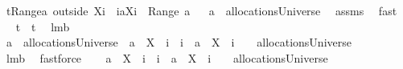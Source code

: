 \begin{isabellebody}
\isamarkupfalse%
\ {\isacharquery}t{}{\isacharequal}{\isachardoublequoteopen}{\isasymUnion}{\isacharparenleft}Range{\isacharparenleft}{\isacharparenleft}a\ outside\ {\isacharparenleft}X{\isasymunion}{\isacharbraceleft}i{\isacharbraceright}{\isacharparenright}{\isacharparenright}\ {\isasymunion}\ {\isacharparenleft}{\isacharbraceleft}i{\isacharbraceright}{\isasymtimes}{\isacharparenleft}{\isacharbraceleft}{\isasymUnion}{\isacharparenleft}a{\isacharbackquote}{\isacharbackquote}{\isacharparenleft}X{\isasymunion}{\isacharbraceleft}i{\isacharbraceright}{\isacharparenright}{\isacharparenright}{\isacharbraceright}{\isacharminus}{\isacharbraceleft}{\isacharbraceleft}{\isacharbraceright}{\isacharbraceright}{\isacharparenright}{\isacharparenright}{\isacharparenright}{\isacharparenright}\ {\isacharequal}\ {\isasymUnion}{\isacharparenleft}Range\ a{\isacharparenright}{\isachardoublequoteclose}\isanewline
{}\isamarkupfalse%
\ \isanewline
{}{\isacharcolon}\ {\isachardoublequoteopen}a\ {\isasymin}\ allocationsUniverse{\isachardoublequoteclose}\ \isamarkupfalse%
\ assms{\isacharparenleft}{}{\isacharparenright}\ \isamarkupfalse%
\ fast\ \isanewline
{}\isamarkupfalse%
\ \isamarkupfalse%
\ {\isachardoublequoteopen}{\isacharquery}t{}\ {\isacharampersand}\ {\isacharquery}t{}{\isachardoublequoteclose}\ \isamarkupfalse%
\ lm{}{}b\ \isanewline
{}\isamarkupfalse%
\ {\isacharminus}\ \isanewline
\isanewline
\ \ \isamarkupfalse%
\ {\isachardoublequoteopen}a\ {\isasymin}\ allocationsUniverse\ {\isasymlongrightarrow}\ a\ {\isacharminus}{\isacharbar}\ {\isacharparenleft}X\ {\isasymunion}\ {\isacharbraceleft}i{\isacharbraceright}{\isacharparenright}\ {\isasymunion}\ {\isacharbraceleft}i{\isacharbraceright}\ {\isasymtimes}\ {\isacharparenleft}{\isacharbraceleft}{\isasymUnion}{\isacharparenleft}a\ {\isacharbackquote}{\isacharbackquote}\ {\isacharparenleft}X\ {\isasymunion}\ {\isacharbraceleft}i{\isacharbraceright}{\isacharparenright}{\isacharparenright}{\isacharbraceright}\ {\isacharminus}\ {\isacharbraceleft}{\isacharbraceleft}{\isacharbraceright}{\isacharbraceright}{\isacharparenright}\ {\isasymin}\ allocationsUniverse{\isachardoublequoteclose}\isanewline
\ \ \ \ \isamarkupfalse%
\ lm{}{}b\ \isamarkupfalse%
\ fastforce\isanewline
\ \ \isamarkupfalse%
\ {\isachardoublequoteopen}a\ {\isacharminus}{\isacharbar}\ {\isacharparenleft}X\ {\isasymunion}\ {\isacharbraceleft}i{\isacharbraceright}{\isacharparenright}\ {\isasymunion}\ {\isacharbraceleft}i{\isacharbraceright}\ {\isasymtimes}\ {\isacharparenleft}{\isacharbraceleft}{\isasymUnion}{\isacharparenleft}a\ {\isacharbackquote}{\isacharbackquote}\ {\isacharparenleft}X\ {\isasymunion}\ {\isacharbraceleft}i{\isacharbraceright}{\isacharparenright}{\isacharparenright}{\isacharbraceright}\ {\isacharminus}\ {\isacharbraceleft}{\isacharbraceleft}{\isacharbraceright}{\isacharbraceright}{\isacharparenright}\ {\isasymin}\ allocationsUniverse{\isachardoublequoteclose}\isanewline

\end{isabellebody}

